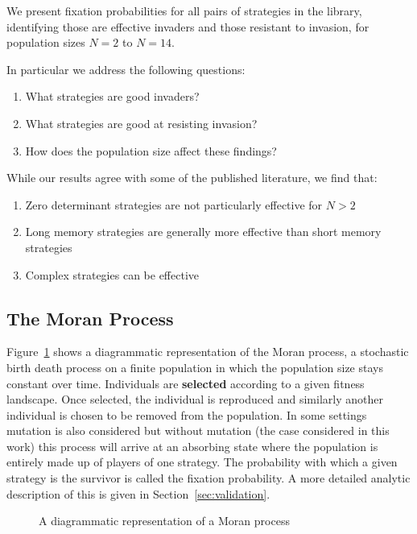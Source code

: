 \documentclass{article}
\begin{document}
We present fixation probabilities for all pairs of
strategies in the library, identifying those are effective invaders and
those resistant to invasion, for population sizes $N=2$ to $N=14$.

In particular we address the following questions:
\begin{enumerate}
    \item What strategies are good invaders?
    \item What strategies are good at resisting invasion?
    \item How does the population size affect these findings?
\end{enumerate}


While our results agree with some of the published literature, we find that:

\begin{enumerate}
 \item Zero determinant strategies are not particularly effective for $N > 2$
 \item Long memory strategies are generally more effective than short
       memory strategies
 \item Complex strategies can be effective
\end{enumerate}


\subsection{The Moran Process}

Figure~\ref{fig:moran_process} shows a diagrammatic representation of the Moran
process, a stochastic birth death process on a finite population
in which the population size stays constant over time. Individuals are
\textbf{selected} according to a given fitness landscape. Once selected, the
individual is reproduced and similarly another individual is chosen to be
removed from the population. In some settings mutation is also considered but
without mutation (the case considered in this work) this process will arrive at
an absorbing state where the population is entirely made up of players of
one strategy. The probability with which a given strategy is the survivor is
called the fixation probability. A more detailed analytic description of this
is given in Section~\ref{sec:validation}.

\begin{figure}[!hbtp]
    \centering
    
    \caption{A diagrammatic representation of a Moran process}
    \label{fig:moran_process}
\end{figure}
\end{document}
